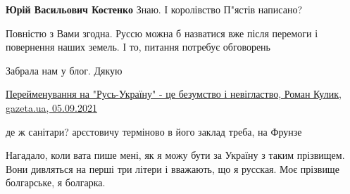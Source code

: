 \begin{itemize}
\begin{itemize}
 
\textbf{Юрій Васильович Костенко} Знаю. І королівство П"ястів написано?
\end{itemize}

 
Повністю з Вами згодна. Руссю можна б назватися вже після перемоги і повернення
наших земель. І то, питання потребує обговорень


 
Забрала нам у блог. Дякую

\href{https://gazeta.ua/blog/55697/perejmenuvannya-na-rusukrayinu-ce-bezumstvo-i-neviglastvo}{%
Перейменування на "Русь-Україну" - це безумство і невігластво, Роман Кулик, gazeta.ua, 05.09.2021%
}

 
де ж санітари? арєстовичу терміново в його заклад треба, на Фрунзе

 
Нагадало, коли вата пише мені, як я можу бути за Україну з таким прізвищем. Вони дивляться на перші три літери і вважають, що я русская.
Моє прізвище болгарське, я болгарка.

 

\end{itemize}

